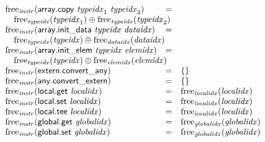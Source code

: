 $$\begin{array}[t]{@{}lcl@{}l@{}}
{\mathrm{free}}_{\mathit{instr}}(\mathsf{array{.}copy}~{\mathit{typeidx}}_1~{\mathit{typeidx}}_2) & = & & \\
 \multicolumn{4}{@{}l@{}}{\quad
\begin{array}[t]{@{}l@{}}
{\mathrm{free}}_{\mathit{typeidx}}({\mathit{typeidx}}_1) \oplus {\mathrm{free}}_{\mathit{typeidx}}({\mathit{typeidx}}_2) \\
\end{array}
} \\
{\mathrm{free}}_{\mathit{instr}}(\mathsf{array{.}init\_data}~{\mathit{typeidx}}~{\mathit{dataidx}}) & = & & \\
 \multicolumn{4}{@{}l@{}}{\quad
\begin{array}[t]{@{}l@{}}
{\mathrm{free}}_{\mathit{typeidx}}({\mathit{typeidx}}) \oplus {\mathrm{free}}_{\mathit{dataidx}}({\mathit{dataidx}}) \\
\end{array}
} \\
{\mathrm{free}}_{\mathit{instr}}(\mathsf{array{.}init\_elem}~{\mathit{typeidx}}~{\mathit{elemidx}}) & = & & \\
 \multicolumn{4}{@{}l@{}}{\quad
\begin{array}[t]{@{}l@{}}
{\mathrm{free}}_{\mathit{typeidx}}({\mathit{typeidx}}) \oplus {\mathrm{free}}_{\mathit{elemidx}}({\mathit{elemidx}}) \\
\end{array}
} \\
{\mathrm{free}}_{\mathit{instr}}(\mathsf{extern{.}convert\_any}) & = & \{  \} \\
{\mathrm{free}}_{\mathit{instr}}(\mathsf{any{.}convert\_extern}) & = & \{  \} \\
{\mathrm{free}}_{\mathit{instr}}(\mathsf{local{.}get}~{\mathit{localidx}}) & = & {\mathrm{free}}_{\mathit{localidx}}({\mathit{localidx}}) \\
{\mathrm{free}}_{\mathit{instr}}(\mathsf{local{.}set}~{\mathit{localidx}}) & = & {\mathrm{free}}_{\mathit{localidx}}({\mathit{localidx}}) \\
{\mathrm{free}}_{\mathit{instr}}(\mathsf{local{.}tee}~{\mathit{localidx}}) & = & {\mathrm{free}}_{\mathit{localidx}}({\mathit{localidx}}) \\
{\mathrm{free}}_{\mathit{instr}}(\mathsf{global{.}get}~{\mathit{globalidx}}) & = & {\mathrm{free}}_{\mathit{globalidx}}({\mathit{globalidx}}) \\
{\mathrm{free}}_{\mathit{instr}}(\mathsf{global{.}set}~{\mathit{globalidx}}) & = & {\mathrm{free}}_{\mathit{globalidx}}({\mathit{globalidx}}) \\

\end{array}$$
